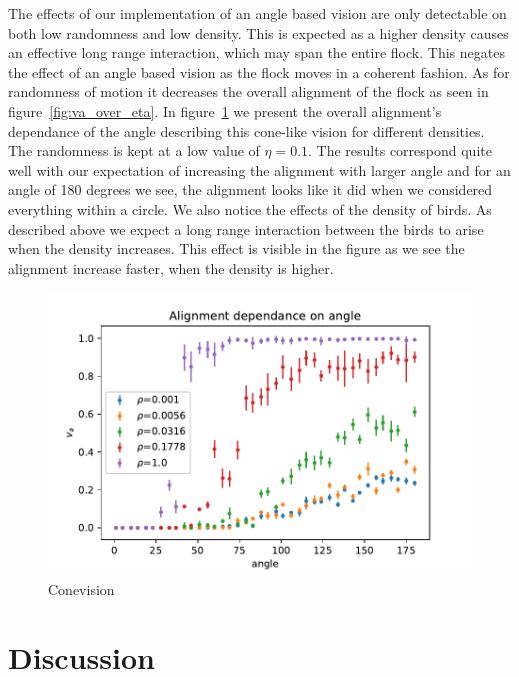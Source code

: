 \documentclass[twoside,twocolumn]{article}
\begin{document}
The effects of our implementation of an angle based vision are only detectable on both low randomness and low density. This is expected as a higher density causes an effective long range interaction, which may span the entire flock. This negates the effect of an angle based vision as the flock moves in a coherent fashion. As for randomness of motion it decreases the overall alignment of the flock as seen in figure~\ref{fig:va_over_eta}. In figure~\ref{fig:conevision} we present the overall alignment's dependance of the angle describing this cone-like vision for different densities. The randomness is kept at a low value of $\eta=0.1$. The results correspond quite well with our expectation of increasing the alignment with larger angle and for an angle of 180 degrees we see, the alignment looks like it did when we considered everything within a circle. We also notice the effects of the density of birds. As described above we expect a long range interaction between the birds to arise when the density increases. This effect is visible in the figure as we see the alignment increase faster, when the density is higher.

\begin{figure}[!htb]
  \begin{center}
    \includegraphics[width=\columnwidth]{va_over_angle}
  \end{center}
  \caption{Conevision}
  \label{fig:conevision}
\end{figure}


\section{Discussion}
\end{document}
